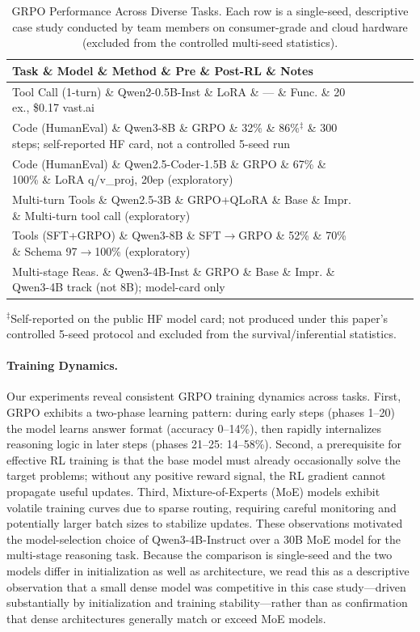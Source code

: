 \documentclass[manuscript,review,anonymous]{acmart}
\begin{document}
\begin{table}[t]
\centering
\caption{GRPO Performance Across Diverse Tasks. Each row is a single-seed,
descriptive case study conducted by team members on consumer-grade and cloud
hardware (excluded from the controlled multi-seed statistics).}
\label{tab:task_grpo}
\footnotesize
\begin{tabular}{@{}l l l c c p{2.8cm}@{}}
\toprule
\textbf{Task} \& \textbf{Model} \& \textbf{Method} \& \textbf{Pre} \& \textbf{Post-RL} \& \textbf{Notes} \\
\midrule
Tool Call (1-turn) \& Qwen2-0.5B-Inst \& LoRA \& --- \& Func. \& 20 ex., \$0.17 vast.ai \\
Code (HumanEval) \& Qwen3-8B \& GRPO \& 32\% \& 86\%$^{\ddagger}$ \& 300 steps; self-reported HF card, not a controlled 5-seed run \\
Code (HumanEval) \& Qwen2.5-Coder-1.5B \& GRPO \& 67\% \& 100\% \& LoRA q/v\_proj, 20ep (exploratory) \\
Multi-turn Tools \& Qwen2.5-3B \& GRPO+QLoRA \& Base \& Impr. \& Multi-turn tool call (exploratory) \\
Tools (SFT+GRPO) \& Qwen3-8B \& SFT$\to$GRPO \& 52\% \& 70\% \& Schema 97$\to$100\% (exploratory) \\
Multi-stage Reas. \& Qwen3-4B-Inst \& GRPO \& Base \& Impr. \& Qwen3-4B track (not 8B); model-card only \\
\bottomrule
\end{tabular}

\vspace{2pt}
{\scriptsize $^{\ddagger}$Self-reported on the public HF model card; not produced under this paper's controlled 5-seed protocol and excluded from the survival/inferential statistics.}

\end{table}

\paragraph{Training Dynamics.}
Our experiments reveal consistent GRPO training dynamics across tasks.
First, GRPO exhibits a two-phase learning pattern: during early steps (phases
1--20) the model learns answer format (accuracy 0--14\%), then rapidly
internalizes reasoning logic in later steps (phases 21--25: 14--58\%).
Second, a prerequisite for effective RL training is that the base model must
already occasionally solve the target problems; without any positive reward
signal, the RL gradient cannot propagate useful updates. Third, Mixture-of-Experts
(MoE) models exhibit volatile training curves due to sparse routing, requiring
careful monitoring and potentially larger batch sizes to stabilize updates.
These observations motivated the model-selection choice of Qwen3-4B-Instruct
over a 30B MoE model for the multi-stage reasoning task. Because the comparison
is single-seed and the two models differ in initialization as well as
architecture, we read this as a descriptive observation that a small dense
model was competitive in this case study---driven substantially by
initialization and training stability---rather than as confirmation that dense
architectures generally match or exceed MoE models.
\end{document}
